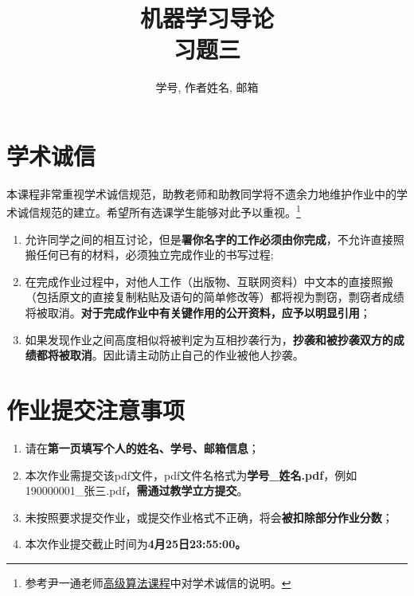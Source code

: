 \documentclass[a4paper,UTF8]{article}
\theoremstyle{definition}
\begin{document}
\title{机器学习导论\\
	习题三}
\author{学号, 作者姓名, 邮箱}
\maketitle


\section*{学术诚信}

本课程非常重视学术诚信规范，助教老师和助教同学将不遗余力地维护作业中的学术诚信规范的建立。希望所有选课学生能够对此予以重视。\footnote{参考尹一通老师\href{http://tcs.nju.edu.cn/wiki/}{高级算法课程}中对学术诚信的说明。}

\begin{tcolorbox}
	\begin{enumerate}[(1)]
		\item 允许同学之间的相互讨论，但是{\color{red}\textbf{署你名字的工作必须由你完成}}，不允许直接照搬任何已有的材料，必须独立完成作业的书写过程;
		\item 在完成作业过程中，对他人工作（出版物、互联网资料）中文本的直接照搬（包括原文的直接复制粘贴及语句的简单修改等）都将视为剽窃，剽窃者成绩将被取消。{\color{red}\textbf{对于完成作业中有关键作用的公开资料，应予以明显引用}}；
		\item 如果发现作业之间高度相似将被判定为互相抄袭行为，{\color{red}\textbf{抄袭和被抄袭双方的成绩都将被取消}}。因此请主动防止自己的作业被他人抄袭。
	\end{enumerate}
\end{tcolorbox}

\section*{作业提交注意事项}
\begin{tcolorbox}
	\begin{enumerate}[(1)]
		\item 请在{\color{red}\textbf{第一页填写个人的姓名、学号、邮箱信息}}；
		\item 本次作业需提交该pdf文件，pdf文件名格式为{\color{red}\textbf{学号\_姓名.pdf}}，例如190000001\_张三.pdf，{\color{red}\textbf{需通过教学立方提交}}。
		\item 未按照要求提交作业，或提交作业格式不正确，将会{\color{red}\textbf{被扣除部分作业分数}}；
		\item 本次作业提交截止时间为{\color{red}\textbf{4月25日23:55:00。}}
	\end{enumerate}
\end{tcolorbox}
\end{document}
